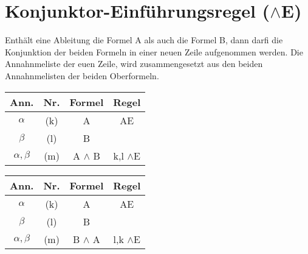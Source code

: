 \documentclass{sajzk}
\begin{document}
\section{Konjunktor-Einführungsregel \texorpdfstring{($\land$E)}{(and E)}}
\label{zzno}
Enthält eine Ableitung die Formel A als auch die Formel B, dann darfi die
Konjunktion der beiden Formeln in einer neuen Zeile aufgenommen werden. Die
Annahnmeliste der euen Zeile, wird zusammengesetzt aus den beiden
Annahnmelisten der beiden Oberformeln.

\begin{center}
  \begin{minipage}[t]{0.4\textwidth}
    \begin{tabular}{|c|c|c|c|}
      \hline
      Ann.               & Nr.    & Formel       & Regel \\
      \hline
      $\alpha$           & (k)    & A            & AE \\
      \hline
      $\beta$            & (l)    & B            &  \\
      \hline
      $\alpha, \beta$    & (m)    & A $\land$ B  & k,l $\land$E \\
      \hline
    \end{tabular}
  \end{minipage}
  \begin{minipage}[t]{0.4\textwidth}
    \begin{tabular}{|c|c|c|c|}
      \hline
      Ann.               & Nr.    & Formel       & Regel \\
      \hline
      $\alpha$           & (k)    & A            & AE \\
      \hline
      $\beta$            & (l)    & B            &  \\
      \hline
      $\alpha, \beta$    & (m)    & B $\land$ A  & l,k $\land$E \\
      \hline
    \end{tabular}
  \end{minipage}
\end{center}
\end{document}
